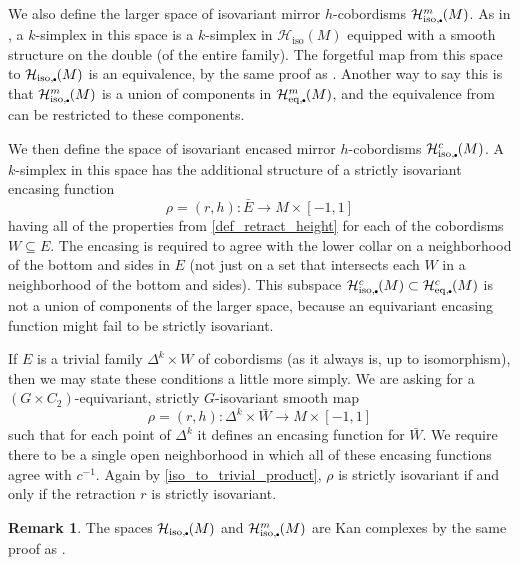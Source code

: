 \documentclass[11pt]{amsart}
\theoremstyle{definition}
\newtheorem{rem}{Remark}[section]
\numberwithin{equation}{section}
\numberwithin{figure}{section}
\newcommand{\mc}{\mathcal}
\newcommand{\Hiso}{\mathcal{H}_{\iso}}
\newcommand{\iso}{\mathrm{iso}}
\newcommand{\eq}{\mathrm{eq}}
\newcommand{\sbt}{\,\begin{picture}(-1,1)(0.5,-1)\circle*{1.8}\end{picture}\hspace{.05cm}}
\newcommand{\rh}{encasing function }
\newcommand{\rhs}{encasing functions }
\begin{document}
We also define the larger space of isovariant mirror $h$-cobordisms $\mc H_{\iso,\sbt}^m(M)$. As in \cite[Def 4.8]{GIMM1}, a $k$-simplex in this space is a $k$-simplex in $\Hiso(M) $ equipped with a smooth structure on the double (of the entire family). The forgetful map from this space to  $\mc H_{\iso,\sbt}(M)$ is an equivalence, by the same proof as \cite[Prop 4.13]{GIMM1}. Another way to say this is that $\mc H_{\iso,\sbt}^m(M)$ is a union of components in $\mc H_{\eq,\sbt}^m(M)$, and the equivalence from \cite[Prop 4.13]{GIMM1} can be restricted to these components.

We then define the space of isovariant encased mirror $h$-cobordisms $\mc H_{\iso,\sbt}^c(M)$. A $k$-simplex in this space has the additional structure of a strictly isovariant \rh
\[ \rho = (r,h)\colon\bar E \to M \times [-1,1] \]
having all of the properties from \autoref{def_retract_height} for each of the cobordisms $W \subseteq E$. The encasing is required to agree with the lower collar on a neighborhood of the bottom and sides in $E$ (not just on a set that intersects each $W$ in a neighborhood of the bottom and sides). This subspace  $\mc H_{\iso,\sbt}^c(M)\subset \mc H_{\eq,\sbt}^c(M)$ is not a union of components of the larger space, because an equivariant encasing function might fail to be strictly isovariant.

If $E$ is a trivial family $\Delta^k \times W$ of cobordisms (as it always is, up to isomorphism), then we may state these conditions a little more simply. We are asking for a $(G \times C_2)$-equivariant, strictly $G$-isovariant smooth map
\[ \rho = (r,h)\colon \Delta^k \times \bar W \to M \times [-1,1] \]
such that for each point of $\Delta^k$ it defines an encasing function for $\bar W$. We require there to be a single open neighborhood in which all of these \rhs agree with $c^{-1}$. Again by \autoref{iso_to_trivial_product}, $\rho$ is strictly isovariant if and only if the retraction $r$ is strictly isovariant. 


\begin{rem}\label{h_cob_space_kan}
	The spaces $\mc H_{\iso,\sbt}(M)$ and $\mc H_{\iso,\sbt}^m(M)$ are Kan complexes by the same proof as \cite[Lem 4.11]{GIMM1}.
\end{rem}
\end{document}
